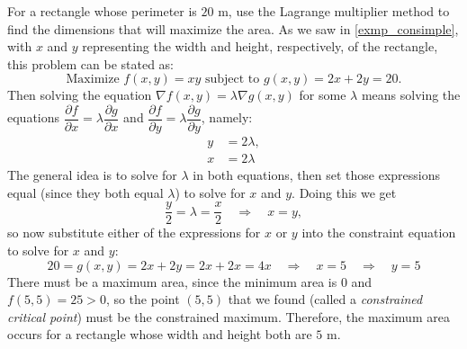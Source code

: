 \begin{example}\label{exmp_rectlm}
For a rectangle whose perimeter is $20$ m, use the Lagrange multiplier method to find the dimensions that will maximize the area.
\solution
As we saw in \autoref{exmp_consimple}, with $x$ and $y$ representing the width and height, respectively, of the rectangle, this problem can be stated as:
 \[\text{Maximize }f(x,y) = xy\text{ subject to }g(x,y) = 2x + 2y = 20.\]
 Then solving the equation $\nabla f(x,y) = \lambda \nabla g(x,y)$ for some $\lambda$ means solving the equations $\dfrac{\partial f}{\partial x} = \lambda \dfrac{\partial g}{\partial x}$ and $\dfrac{\partial f}{\partial y} = \lambda \dfrac{\partial g}{\partial y}$, namely:
 \begin{align*}
  y &= 2\lambda ,\\
  x &= 2\lambda
 \end{align*}
 The general idea is to solve for $\lambda$ in both equations, then set those expressions equal (since they both equal $\lambda$) to solve for $x$ and $y$. Doing this we get
 \[\frac y2 = \lambda = \frac x2 \quad \Rightarrow \quad x = y ,\]
 so now substitute either of the expressions for $x$ or $y$ into the constraint equation to solve for $x$ and $y$:
 \[20=g(x,y)=2x+2y=2x+2x=4x\quad\Rightarrow\quad x=5\quad\Rightarrow\quad y=5\]
 There must be a maximum area, since the minimum area is $0$ and $f(5,5) = 25 > 0$, so the point $(5,5)$ that we found (called a \emph{constrained critical point}) must be the constrained maximum. Therefore, the maximum area occurs for a rectangle whose width and height both are $5$ m.
\end{example}


